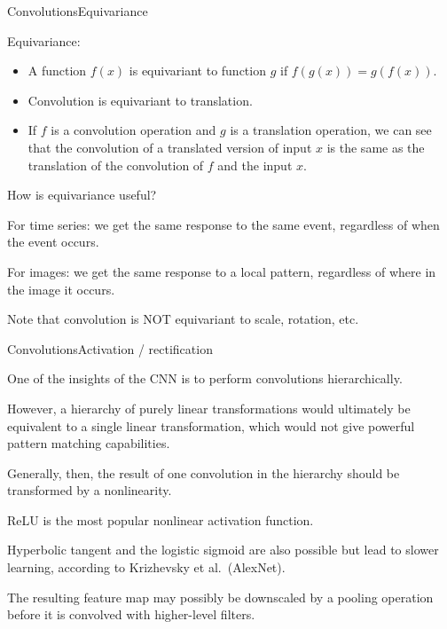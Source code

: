 \documentclass[aspectratio=169]{beamer}
\begin{document}
\begin{frame}{Convolutions}{Equivariance}

  \alert{Equivariance}:
  \begin{itemize}
  \item A function $f(x)$ is \alert{equivariant} to function $g$ if $f(g(x)) =
    g(f(x))$.
  \item Convolution is equivariant to \alert{translation}.
  \item If $f$ is a convolution operation and $g$ is a translation
    operation, we can see that the convolution of a translated version
    of input $x$ is the same as the translation of the convolution of
    $f$ and the input $x$.
  \end{itemize}

  \medskip
  
  How is equivariance useful?

  \medskip

  For time series: we get the same response to the same event,
  \alert{regardless of when} the event occurs.

  \medskip
  
  For images: we get the same response to a local pattern,
  \alert{regardless of where} in the image it occurs.

  \medskip
  
  Note that convolution is NOT equivariant to scale, rotation, etc.

\end{frame}


\begin{frame}{Convolutions}{Activation / rectification}

  One of the insights of the CNN is to perform convolutions
  \alert{hierarchically}.

  \medskip

  However, a hierarchy of purely \alert{linear} transformations would
  ultimately be equivalent to a single linear transformation, which would
  not give powerful pattern matching capabilities.
  
  \medskip
  
  Generally, then, the result of one convolution in the hierarchy
  should be transformed by a nonlinearity.

  \medskip

  ReLU is the most popular
  nonlinear activation function.

  \medskip

  Hyperbolic tangent and the logistic sigmoid are also possible but
  lead to slower learning, according to Krizhevsky et al.\ (AlexNet).

  \medskip
  
  The resulting feature map may possibly be downscaled by a
  \alert{pooling} operation before it is convolved with higher-level
  filters.
  
\end{frame}
\end{document}
